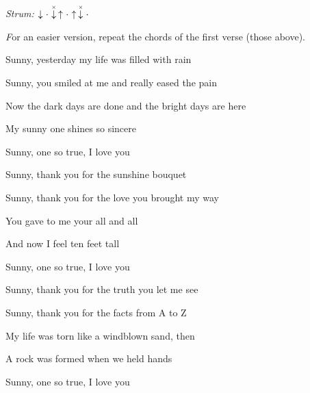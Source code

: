 \begin{song}


\begin{strumbox}
\textit{Strum:} $\Down\Miss\ChuckDown\Up\Miss\Up\ChuckDown\Miss$
\end{strumbox}

\begin{hchordbox}
\hspace{-2em} %
\end{hchordbox}

\large

\bigskip

{
\smaller \textit For an easier version, repeat the chords of the first verse (those above).
}

\bigskip

Sunny,  yesterday my life was filled with rain  \par
{}Sunny,  you smiled at me and  really eased the pain  \par
Now the dark days are done and the bright days are here \par
{}My sunny one shines so sincere \par
{}Sunny, one so true, I love you \par

\bigskip

Sunny,  thank you for the sunshine bouquet  \par
{}Sunny,  thank you for the love you brought my way  \par
You gave to me your all and all \par
And now I feel ten feet tall \par
{}Sunny, one so true, I love you  \par

\bigskip

Sunny,  thank you for the truth you let me see  \par
{}Sunny,  thank you for the facts from A to Z  \par
{}My life was torn like a windblown sand, then \par
{}A rock was formed when we held hands \par
{}Sunny, one so true, I love you  \par


\end{song}
